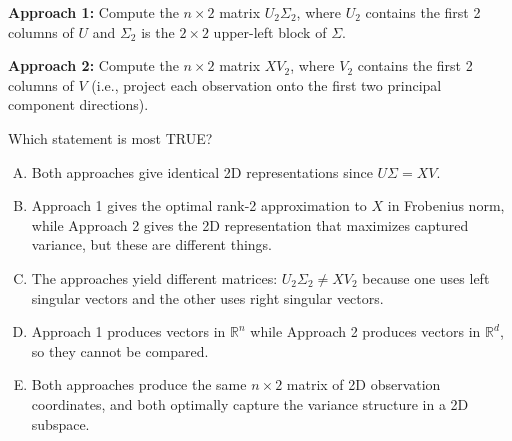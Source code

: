 \documentclass[12pt]{amsart}
\begin{document}
\textbf{Approach 1:} Compute the $n \times 2$ matrix $U_2\Sigma_2$, where $U_2$ contains the first 2 columns of $U$ and $\Sigma_2$ is the $2 \times 2$ upper-left block of $\Sigma$.

\textbf{Approach 2:} Compute the $n \times 2$ matrix $XV_2$, where $V_2$ contains the first 2 columns of $V$ (i.e., project each observation onto the first two principal component directions).

Which statement is most TRUE?

\begin{enumerate}[(A)]
\item Both approaches give identical 2D representations since $U\Sigma = XV$.
\item Approach 1 gives the optimal rank-2 approximation to $X$ in Frobenius norm, while Approach 2 gives the 2D representation that maximizes captured variance, but these are different things.
\item The approaches yield different matrices: $U_2\Sigma_2 \neq XV_2$ because one uses left singular vectors and the other uses right singular vectors.
\item Approach 1 produces vectors in $\mathbb{R}^n$ while Approach 2 produces vectors in $\mathbb{R}^d$, so they cannot be compared.
\item Both approaches produce the same $n \times 2$ matrix of 2D observation coordinates, and both optimally capture the variance structure in a 2D subspace.
\end{enumerate}

\end{document}
